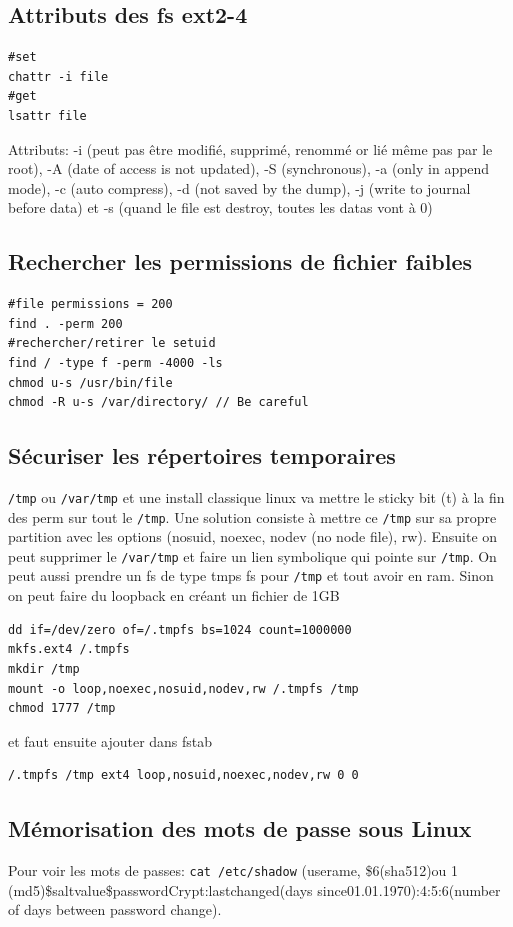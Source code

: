 \subsection{Attributs des fs ext2-4}
\begin{Verbatim}[breaklines=true, breakanywhere=true]
#set
chattr -i file
#get
lsattr file
\end{Verbatim}
Attributs: -i (peut pas être modifié, supprimé, renommé or lié même pas par le root), -A (date of access is not updated), -S (synchronous), -a (only in append mode), -c (auto compress), -d (not saved by the dump), -j (write to journal before data) et -s (quand le file est destroy, toutes les datas vont à 0)
\subsection{Rechercher les permissions de fichier faibles}
\begin{Verbatim}[breaklines=true, breakanywhere=true]
#file permissions = 200
find . -perm 200
#rechercher/retirer le setuid 
find / -type f -perm -4000 -ls 
chmod u-s /usr/bin/file 
chmod -R u-s /var/directory/ // Be careful
\end{Verbatim}

\subsection{Sécuriser les répertoires temporaires}
\verb!/tmp! ou \verb!/var/tmp! et une install classique linux va mettre le sticky bit (t) à la fin des perm sur tout le \verb!/tmp!. Une solution consiste à mettre ce \verb!/tmp! sur sa propre partition avec les options (nosuid, noexec, nodev (no node file), rw). Ensuite on peut supprimer le \verb!/var/tmp! et faire un lien symbolique qui pointe sur \verb!/tmp!. On peut aussi prendre un fs de type tmps fs pour \verb!/tmp! et tout avoir en ram.
Sinon on peut faire du loopback en créant un fichier de 1GB
\begin{Verbatim}[breaklines=true, breakanywhere=true]
dd if=/dev/zero of=/.tmpfs bs=1024 count=1000000
mkfs.ext4 /.tmpfs
mkdir /tmp
mount -o loop,noexec,nosuid,nodev,rw /.tmpfs /tmp
chmod 1777 /tmp
\end{Verbatim}
et faut ensuite ajouter dans fstab
\begin{Verbatim}[breaklines=true, breakanywhere=true]
/.tmpfs /tmp ext4 loop,nosuid,noexec,nodev,rw 0 0
\end{Verbatim}

\subsection{Mémorisation des mots de passe sous Linux}
Pour voir les mots de passes: \verb!cat /etc/shadow! (userame, \$6(sha512)ou 1 (md5)\$saltvalue\$passwordCrypt:lastchanged(days since01.01.1970):4:5:6(number of days between password change).


